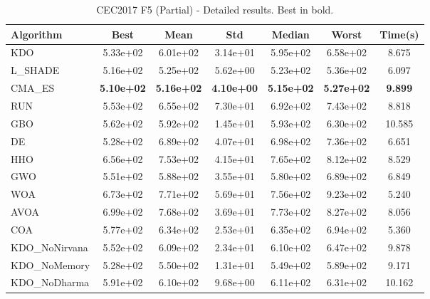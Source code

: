 \begin{table}[H]
\centering\small
\caption{CEC2017 F5 (Partial) - Detailed results. Best in bold.}
\label{tab:cec2017_F5}
\begin{tabular}{lcccccc}
\toprule
\textbf{Algorithm} & \textbf{Best} & \textbf{Mean} & \textbf{Std} & \textbf{Median} & \textbf{Worst} & \textbf{Time(s)} \\
\midrule
KDO & 5.33e+02 & 6.01e+02 & 3.14e+01 & 5.95e+02 & 6.58e+02 & 8.675 \\
L_SHADE & 5.16e+02 & 5.25e+02 & 5.62e+00 & 5.23e+02 & 5.36e+02 & 6.097 \\
CMA_ES & \textbf{5.10e+02} & \textbf{5.16e+02} & \textbf{4.10e+00} & \textbf{5.15e+02} & \textbf{5.27e+02} & \textbf{9.899} \\
RUN & 5.53e+02 & 6.55e+02 & 7.30e+01 & 6.92e+02 & 7.43e+02 & 8.818 \\
GBO & 5.62e+02 & 5.92e+02 & 1.45e+01 & 5.93e+02 & 6.30e+02 & 10.585 \\
DE & 5.28e+02 & 6.89e+02 & 4.07e+01 & 6.98e+02 & 7.36e+02 & 6.651 \\
HHO & 6.56e+02 & 7.53e+02 & 4.15e+01 & 7.65e+02 & 8.12e+02 & 8.529 \\
GWO & 5.51e+02 & 5.88e+02 & 3.55e+01 & 5.80e+02 & 6.89e+02 & 6.849 \\
WOA & 6.73e+02 & 7.71e+02 & 5.69e+01 & 7.56e+02 & 9.23e+02 & 5.240 \\
AVOA & 6.99e+02 & 7.68e+02 & 3.69e+01 & 7.73e+02 & 8.27e+02 & 8.056 \\
COA & 5.77e+02 & 6.34e+02 & 2.53e+01 & 6.35e+02 & 6.94e+02 & 5.360 \\
KDO_NoNirvana & 5.52e+02 & 6.09e+02 & 2.34e+01 & 6.10e+02 & 6.47e+02 & 9.878 \\
KDO_NoMemory & 5.28e+02 & 5.50e+02 & 1.31e+01 & 5.49e+02 & 5.89e+02 & 9.171 \\
KDO_NoDharma & 5.91e+02 & 6.10e+02 & 9.68e+00 & 6.11e+02 & 6.31e+02 & 10.162 \\
\bottomrule
\end{tabular}
\end{table}
